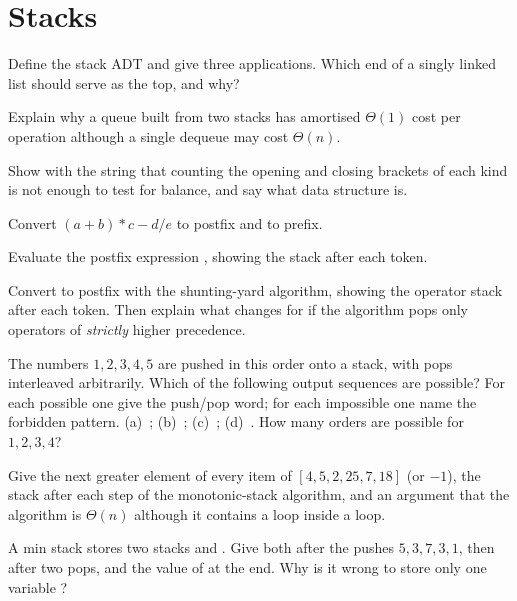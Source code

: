 \section*{Stacks}
\begin{questions}[resume]
\item Define the stack ADT and give three applications. Which end of a singly linked list
  should serve as the top, and why?
\item Explain why a queue built from two stacks has amortised $\Theta(1)$ cost per
  operation although a single dequeue may cost $\Theta(n)$.
\item Show with the string \cc{([)]} that counting the opening and closing brackets of
  each kind is not enough to test for balance, and say what data structure is.
\item Convert $(a+b)*c-d/e$ to postfix and to prefix.
\item Evaluate the postfix expression , showing the stack after
  each token.
\item Convert  to postfix with the shunting-yard algorithm, showing the
  operator stack after each token. Then explain what changes for  if the
  algorithm pops only operators of \emph{strictly} higher precedence.
\item The numbers $1,2,3,4,5$ are pushed in this order onto a stack, with pops
  interleaved arbitrarily. Which of the following output sequences are possible? For each
  possible one give the push/pop word; for each impossible one name the forbidden pattern.
  (a)~; (b)~; (c)~; (d)~. How
  many orders are possible for $1,2,3,4$?
\item Give the next greater element of every item of $[4,5,2,25,7,18]$ (or $-1$), the
  stack after each step of the monotonic-stack algorithm, and an argument that the
  algorithm is $\Theta(n)$ although it contains a loop inside a loop.
\item A min stack stores two stacks  and . Give both after the pushes
  $5,3,7,3,1$, then after two pops, and the value of  at the end. Why is it
  wrong to store only one variable ?
\end{questions}


